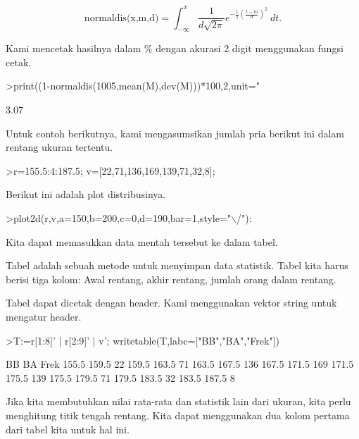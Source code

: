 \documentclass[a4paper,10pt]{article}
\begin{document}
\begin{eulernotebook}
\begin{eulercomment}
\end{eulercomment}
\begin{eulerformula}
\[
\text{normaldis(x,m,d)}=\int_{-\infty}^x \frac{1}{d\sqrt{2\pi}}e^{-\frac{1}{2}(\frac{t-m}{d})^2}\ dt.
\]
\end{eulerformula}
\begin{eulercomment}
Kami mencetak hasilnya dalam \% dengan akurasi 2 digit menggunakan
fungsi cetak.
\end{eulercomment}
\begin{eulerprompt}
>print((1-normaldis(1005,mean(M),dev(M)))*100,2,unit=" %
\end{eulerprompt}
\begin{euleroutput}
        3.07 %
\end{euleroutput}
\begin{eulercomment}
Untuk contoh berikutnya, kami mengasumsikan jumlah pria berikut ini
dalam rentang ukuran tertentu.
\end{eulercomment}
\begin{eulerprompt}
>r=155.5:4:187.5; v=[22,71,136,169,139,71,32,8];
\end{eulerprompt}
\begin{eulercomment}
Berikut ini adalah plot distribusinya.
\end{eulercomment}
\begin{eulerprompt}
>plot2d(r,v,a=150,b=200,c=0,d=190,bar=1,style="\(\backslash\)/"):
\end{eulerprompt}
\begin{eulercomment}
Kita dapat memasukkan data mentah tersebut ke dalam tabel.

Tabel adalah sebuah metode untuk menyimpan data statistik. Tabel kita
harus berisi tiga kolom: Awal rentang, akhir rentang, jumlah orang
dalam rentang.

Tabel dapat dicetak dengan header. Kami menggunakan vektor string
untuk mengatur header.
\end{eulercomment}
\begin{eulerprompt}
>T:=r[1:8]' | r[2:9]' | v'; writetable(T,labc=["BB","BA","Frek"])
\end{eulerprompt}
\begin{euleroutput}
          BB        BA      Frek
       155.5     159.5        22
       159.5     163.5        71
       163.5     167.5       136
       167.5     171.5       169
       171.5     175.5       139
       175.5     179.5        71
       179.5     183.5        32
       183.5     187.5         8
\end{euleroutput}
\begin{eulercomment}
Jika kita membutuhkan nilai rata-rata dan statistik lain dari ukuran,
kita perlu menghitung titik tengah rentang. Kita dapat menggunakan dua
kolom pertama dari tabel kita untuk hal ini.


\end{eulercomment}
\end{eulernotebook}
\end{document}
